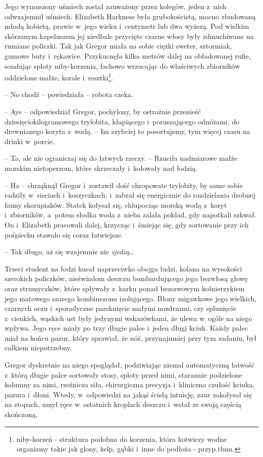 \documentclass[oneside,polish,12pt,sfheadings]{mwbk}
\begin{document}
Jego wymuszony uśmiech został zauważony przez kolegów, jeden z~nich
odwzajemnił uśmiech. Elizabeth Harkness była grubokościstą, mocno
zbudowaną młodą kobietą, prawie w~jego wieku i~centymetr lub dwa wyższą.
Pod wielkim skórzanym kapeluszem jej niedbale przycięte czarne włosy
były zdmuchiwane na rumiane policzki. Tak jak Gregor miała na sobie
ciężki sweter, sztormiak, gumowe buty i~rękawice. Przykucnęła kilka
metrów dalej na obładowanej rufie, sondując sploty niby-korzenia, fachowo
wrzucając do właściwych zbiorników oddzielone małże, korale i~resztki\footnote{niby-korzeń - struktura podobna do
korzenia, która kotwiczy wodne organizmy takie jak glony, kelp, gąbki i~inne do podłoża - przyp.tłum.}.

-- No chodź -- powiedziała -- robota czeka.

-- Aye -- odpowiedział Gregor, pochylony, by ostrożnie przenieść
dziesięciokilogramowego trylobita, kłapiącego i~poruszającego odnóżami,
do drewnianego koryta z~wodą. -- Im szybciej to posortujemy, tym więcej
czasu na drinki w~porcie.

-- Ta, ale nie ograniczaj się do łatwych rzeczy. -- Rzuciła nadmiarowe
małże morskim nietoperzom, które skrzeczały i~kołowały nad łodzią.

-- Ha -- chrząknął Gregor i~zostawił dość chropowate trylobity, by same
sobie radziły w~sieciach i~koszyczkach, i~zabrał się energicznie do
rozdzielania drobnej fauny skorupiaków. Statek kołysał się, chlupocząc
morską wodą z~koryt i~zbiorników, a~potem słodka woda z~nieba zalała
pokład, gdy napotkali szkwał. On i~Elizabeth pracowali dalej, krzycząc i~śmiejąc się, gdy sortowanie przy ich pośpiechu stawało się coraz
łatwiejsze.

-- Tak długo, aż się wzajemnie nie \emph{zjedzą}\ldots

Trzeci student na łodzi kucał naprzeciwko obojga ludzi, kolana na
wysokości szerokich policzków, nieświadom deszczu bombardującego jego
bezwłosą głowę oraz strumyczków, które spływały z~karku ponad bezszwowym
kołnierzykiem jego matowego szarego kombinezonu izolującego. Błony
migawkowe jego wielkich, czarnych oczu i~sporadyczne parsknięcie małymi
nozdrzami, czy splunięcie z~cienkich, wąskich ust były jedynymi
wskazówkami, że ulewa w~ogóle na niego wpływa. Jego ręce miały po trzy
długie palce i~jeden długi kciuk. Każdy palec miał na końcu pazur, który
sprawiał, że nóż, przynajmniej przy tym zadaniu, był całkiem
niepotrzebny.

Gregor dyskretnie na niego spoglądał, podziwiając niemal automatyczną
łatwość z~którą długie palce sortowały stosy, sploty przed nimi,
starannie podzielone kolumny za nimi, rzeźnicza siła, chirurgiczna
precyzja i~kliniczna czułość kciuka, pazura i~dłoni. Wtedy, w~odpowiedzi
na jakąś ścisłą intuicję, zaur zakołysał się na stopach, umył ręce w~ostatnich kroplach deszczu i~wstał ze swoją częścią skończoną.
\end{document}
